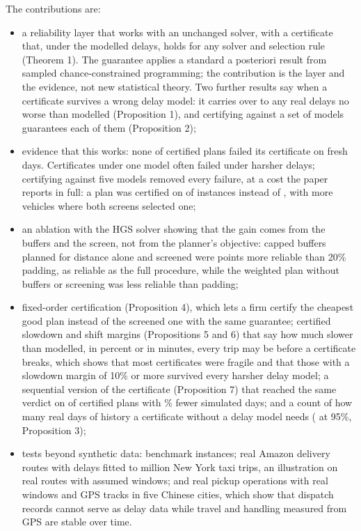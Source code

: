 \documentclass[11pt,a4paper]{article}
\begin{document}
The contributions are:
\begin{itemize}
\item a reliability layer that works with an unchanged solver, with a certificate that, under
the modelled delays, holds for any solver and selection rule (Theorem 1). The guarantee
applies a standard a posteriori result from sampled chance-constrained programming; the
contribution is the layer and the evidence, not new statistical theory. Two further results
say when a certificate survives a wrong delay model: it carries over to any real delays no
worse than modelled (Proposition 1), and certifying against a set of models guarantees each
of them (Proposition 2);
\item evidence that this works: none of \CertTotal{} certified plans failed its
certificate on fresh days. Certificates under one model often failed under harsher delays;
certifying against five models removed every failure, at a cost the paper reports in full:
a plan was certified on \StOStress{} of \StOInst{} instances instead of \StOSingle{}, with
\StOFleet{} more vehicles where both screens selected one;
\item an ablation with the HGS solver showing that the gain comes from the buffers and the
screen, not from the planner's objective: capped buffers planned for distance alone and
screened were \AbDDiff{} points more reliable than 20\% padding, as reliable as the full
procedure, while the weighted plan without buffers or screening was less reliable than
padding;
\item fixed-order certification (Proposition 4), which lets a firm certify the cheapest
good plan instead of the screened one with the same guarantee; certified slowdown and
shift margins (Propositions 5 and 6) that say how much slower than modelled, in percent or
in minutes, every trip may be before a certificate breaks, which shows that most
certificates were fragile and that those with a slowdown margin of 10\% or more survived
every harsher delay model; a sequential version of the certificate (Proposition 7) that
reached the same verdict on \SqCert{} of \SqFixed{} certified plans with \SqSaved\% fewer
simulated days; and a count of how many real days
of history a certificate without a delay model needs (\LfDaysZero{} at 95\%, Proposition 3);
\item tests beyond synthetic data: benchmark instances; real Amazon delivery routes with
delays fitted to \NycTripsM{} million New York taxi trips, an illustration on real routes
with assumed windows; and real pickup operations with real windows and GPS tracks in five
Chinese cities, which show that dispatch records cannot serve as delay data while
travel and handling measured from GPS are stable over time.
\end{itemize}
\end{document}
